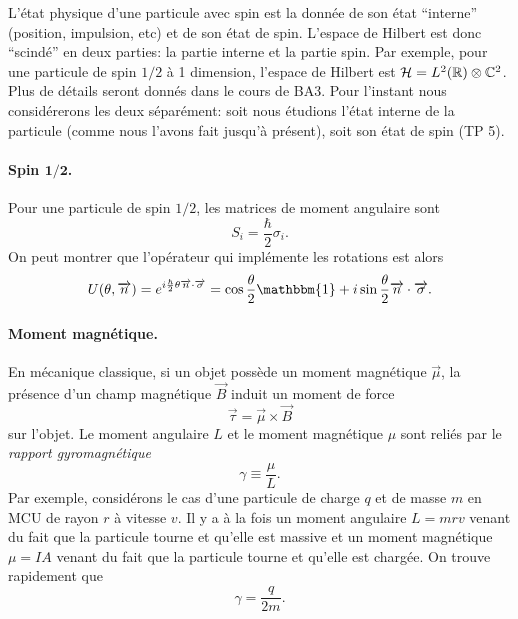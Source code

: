 \documentclass[11pt,a4paper,oneside]{article}
\begin{document}
L'état physique d'une particule avec spin est la donnée de son état ``interne'' (position, impulsion, etc) et de son état de spin. L'espace de Hilbert est donc ``scindé'' en deux parties: la partie interne et la partie spin. Par exemple, pour une particule de spin $1/2$ à 1 dimension, l'espace de Hilbert est $\mathcal{H}=L^2(\mathbb{R})\otimes\mathbb{C}^2$. Plus de détails seront donnés dans le cours de BA3. Pour l'instant nous considérerons les deux séparément: soit nous étudions l'état interne de la particule (comme nous l'avons fait jusqu'à présent), soit son état de spin (TP 5).


\paragraph*{Spin $\boldsymbol{1/2}$.} Pour une particule de spin $1/2$, les matrices de moment angulaire sont
\begin{equation}
    S_i = \frac{\hbar}{2}\sigma_i.
\end{equation}
On peut montrer que l'opérateur qui implémente les rotations est alors
\begin{equation}
    U(\theta,\vec{n}) = e^{i\frac{\hbar}{2}\theta \vec{n}\cdot\vec{\sigma}} = \cos\frac{\theta}{2}\mathbbm{1}+i\sin\frac{\theta}{2}\vec{n}\cdot\vec{\sigma}.
\end{equation}

\paragraph*{Moment magnétique.} En mécanique classique, si un objet possède un moment magnétique $\vec{\mu}$, la présence d'un champ magnétique $\vec{B}$ induit un moment de force
\begin{equation}
    \vec{\tau} = \vec{\mu}\times\vec{B}
\end{equation}
sur l'objet. Le moment angulaire $L$ et le moment magnétique $\mu$ sont reliés par le \emph{rapport gyromagnétique}
\begin{equation}
    \gamma\equiv\frac{\mu}{L}.
\end{equation}
Par exemple, considérons le cas d'une particule de charge $q$ et de masse $m$ en MCU de rayon $r$ à vitesse $v$. Il y a à la fois un moment angulaire $L=mrv$ venant du fait que la particule tourne et qu'elle est massive et un moment magnétique $\mu=IA$ venant du fait que la particule tourne et qu'elle est chargée. On trouve rapidement que
\begin{equation}
    \gamma = \frac{q}{2m}.
\end{equation}
\end{document}
